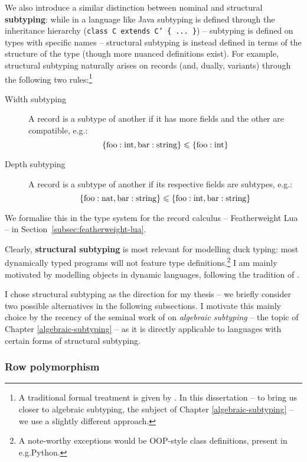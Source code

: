 We also introduce a similar distinction between nominal and structural \textbf{subtyping}: while in a language like Java subtyping is defined through the inheritance hierarchy (\texttt{class C extends C' \{ ... \}}) -- subtyping is defined on types with specific names -- structural subtyping is instead defined in terms of the structure of the type (though more nuanced definitions exist). For example, structural subtyping naturally arises on records (and, dually, variants) through the following two rules:\footnote{A traditional formal treatment is given by \textcite{pierce-book}. In this dissertation -- to bring us closer to algebraic subtyping, the subject of Chapter \ref{algebraic-subtyping} -- we use a slightly different approach.}
\begin{description}
    \item[Width subtyping] A record is a subtype of another if it has more fields and the other are compatible, e.g.: $$ \{ \mathrm{foo} : \mathrm{int}, \mathrm{bar} : \mathrm{string} \} \leqslant \{ \mathrm{foo} : \mathrm{int} \} $$
    \item[Depth subtyping] A record is a subtype of another if its respective fields are subtypes, e.g.:
    $$ \{ \mathrm{foo}: \mathrm{nat}, \mathrm{bar}: \mathrm{string} \} \leqslant \{ \mathrm{foo}: \mathrm{int}, \mathrm{bar}: \mathrm{string} \} $$
\end{description}
We formalise this in the type system for the record calculus -- Featherweight Lua -- in Section~\ref{subsec:featherweight-lua}.

Clearly, \textbf{structural subtyping} is most relevant for modelling duck typing: most dynamically typed programs will not feature type definitions.\footnote{A note-worthy exceptions would be OOP-style class definitions, present in e.g.\@ Python.} I am mainly motivated by modelling objects in dynamic languages, following the tradition of \textcite{cardelli-multiple-inheritance}.

I chose structural subtyping as the direction for my thesis -- we briefly consider two possible alternatives in the following subsections. I motivate this mainly choice by the recency of the seminal work of \textcite{mlsub} on \emph{algebraic subtyping} -- the topic of Chapter \ref{algebraic-subtyping} -- as it is directly applicable to languages with certain forms of structural subtyping.

\subsubsection{Row polymorphism}

